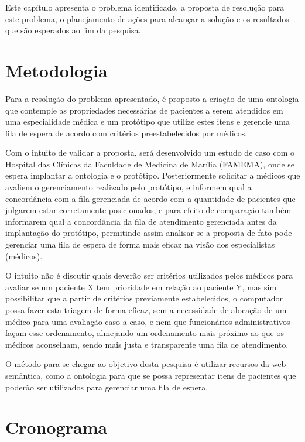 Este capítulo apresenta o problema identificado, a proposta de resolução para este problema, o planejamento de ações para alcançar a solução e os resultados que são esperados ao fim da pesquisa.



\section{Metodologia}
\label{sec:methodology}

 Para a resolução do problema apresentado, é proposto a criação de uma ontologia que contemple  as propriedades necessárias de pacientes a serem atendidos em uma especialidade médica e um protótipo que utilize estes itens e gerencie uma fila de espera de acordo com critérios preestabelecidos por médicos.

    Com o intuito de validar a proposta, será desenvolvido um estudo de caso com o Hospital das Clínicas da Faculdade de Medicina de Marília (FAMEMA), onde se espera implantar a ontologia e o protótipo. Posteriormente solicitar a médicos que avaliem o gerenciamento realizado pelo protótipo, e informem qual a concordância com a fila gerenciada de acordo com a quantidade de pacientes que julgarem estar corretamente posicionados, e para efeito de comparação também informarem qual a concordância da fila de atendimento gerenciada antes da implantação do protótipo, permitindo assim analisar se a proposta de fato pode gerenciar uma fila de espera de forma mais eficaz na visão dos especialistas (médicos).
	
	O intuito não é discutir quais deverão ser critérios utilizados pelos médicos para avaliar se um paciente X tem prioridade em relação ao paciente Y, mas sim possibilitar que a partir de critérios previamente estabelecidos, o computador possa fazer esta triagem de forma eficaz, sem a necessidade de alocação de um médico para uma avaliação caso a caso, e nem que funcionários administrativos façam esse ordenamento, almejando um ordenamento mais próximo ao que os médicos aconselham, sendo mais justa e transparente uma fila de atendimento. 
	
	O método para se chegar ao objetivo desta pesquisa é utilizar recursos da web semântica, como a ontologia para que se possa representar itens de pacientes que poderão ser utilizados para gerenciar uma fila de espera.

    \section{Cronograma}

